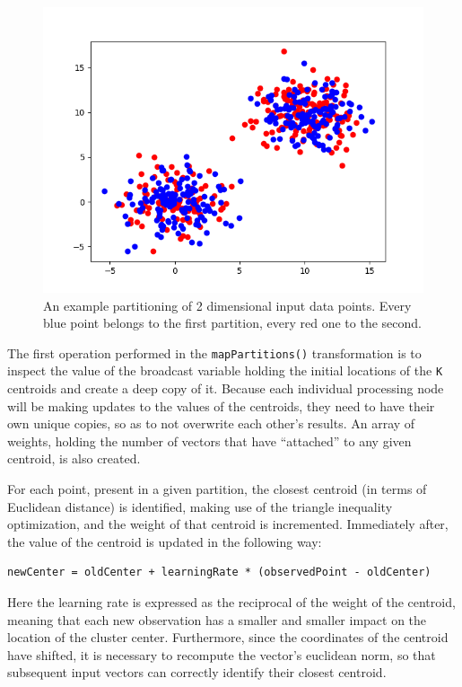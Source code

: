 \documentclass{l4proj}
\begin{document}
\begin{figure}[H]
	\centering
    \label{partitions}
    \includegraphics[width=1.0\textwidth]{images/partitions}
    \caption{An example partitioning of 2 dimensional input data points. Every blue point belongs to the first partition, every red one to the second.} 
\end{figure}

The first operation performed in the \texttt{mapPartitions()} transformation is to inspect the value of the broadcast variable holding the initial locations of the \texttt{K} centroids and create a deep copy of it. Because each individual processing node will be making updates to the values of the centroids, they need to have their own unique copies, so as to not overwrite each other's results. An array of weights, holding the number of vectors that have ``attached'' to any given centroid, is also created.

For each point, present in a given partition, the closest centroid (in terms of Euclidean distance) is identified, making use of the triangle inequality optimization, and the weight of that centroid is incremented. Immediately after, the value of the centroid is updated in the following way:

\begin{center}
\begin{BVerbatim}
newCenter = oldCenter + learningRate * (observedPoint - oldCenter)
\end{BVerbatim}
\end{center}

Here the learning rate is expressed as the reciprocal of the weight of the centroid, meaning that each new observation has a smaller and smaller impact on the location of the cluster center. Furthermore, since the coordinates of the centroid have shifted, it is necessary to recompute the vector's euclidean norm, so that subsequent input vectors can correctly identify their closest centroid. 
\end{document}
